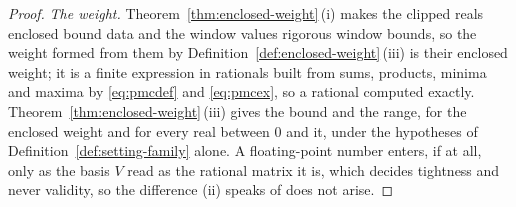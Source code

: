 \begin{proof}
\emph{The weight.} Theorem~\ref{thm:enclosed-weight}\,(i) makes the clipped
reals enclosed bound data and the window values rigorous window bounds, so the
weight formed from them by Definition~\ref{def:enclosed-weight}\,(iii) is their
enclosed weight; it is a finite expression in rationals built from sums,
products, minima and maxima by \eqref{eq:pmcdef} and \eqref{eq:pmcex}, so a
rational computed exactly. Theorem~\ref{thm:enclosed-weight}\,(iii) gives the
bound and the range, for the enclosed weight and for every real between $0$
and it, under the hypotheses of Definition~\ref{def:setting-family} alone.
A floating-point number enters, if at all, only as the basis $V$ read as the
rational matrix it is, which decides tightness and never validity, so the
difference (ii) speaks of does not arise.
\end{proof}
